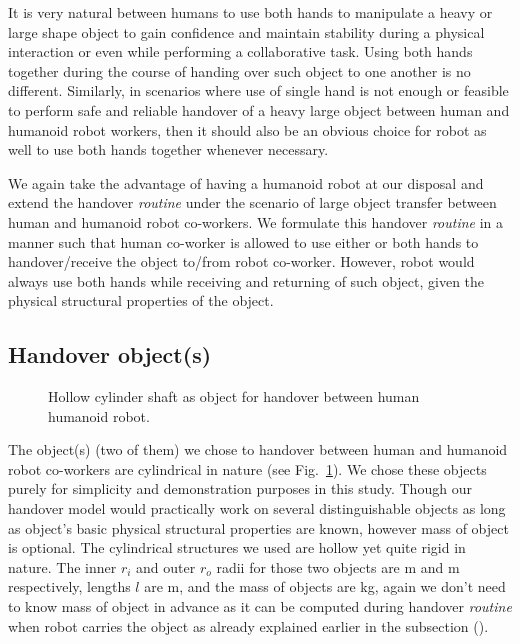 It is very natural between humans to use both hands to manipulate a heavy or large shape object to gain confidence and maintain stability during a physical interaction or even while performing a collaborative task. Using both hands together during the course of handing over such object to one another is no different. Similarly, in scenarios where use of single hand is not enough or feasible to perform safe and reliable handover of a heavy large object between human and humanoid robot workers, then it should also be an obvious choice for robot as well to use both hands together whenever necessary. 


We again take the advantage of having a humanoid robot at our disposal and extend the handover \textit{routine} under the scenario of large object transfer between human and humanoid robot co-workers. We formulate this handover \textit{routine} in a manner such that human co-worker is allowed to use either or both hands to handover/receive the object to/from robot co-worker. However, robot would always use both hands while receiving and returning of such object, given the physical structural properties of the object.

\subsection{Handover object(s)}


\begin{figure}[hpt]
	\caption{Hollow cylinder shaft as object for handover between human humanoid robot.}
	\label{fig:pipe_ex}
\end{figure}


The object(s) (two of them) we chose to handover between human and humanoid robot co-workers are cylindrical in nature (see Fig.~\ref{fig:pipe_ex}). We chose these objects purely for simplicity and demonstration purposes in this study. Though our handover model would practically work on several distinguishable objects as long as object's basic physical structural properties are known, however mass of object is optional. The cylindrical structures we used are hollow yet quite rigid in nature. The inner $r_i$ and outer $r_o$ radii for those two objects are  m and  m respectively, lengths $l$ are  m, and the mass of objects are  kg, again we don't need to know mass of object in advance as it can be computed during handover \textit{routine} when robot carries the object as already explained earlier in the subsection (). 


